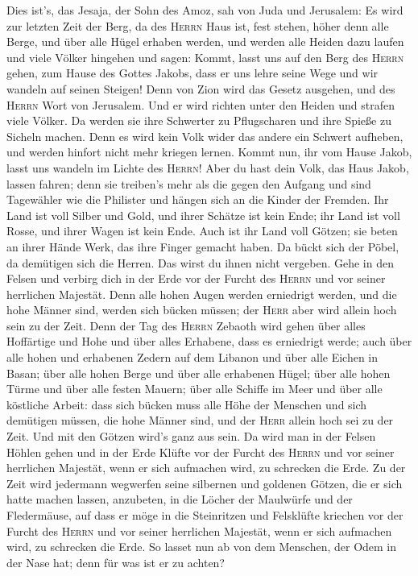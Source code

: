  Dies ist's, das Jesaja, der Sohn des Amoz, sah von Juda
und Jerusalem:  Es wird zur letzten Zeit der Berg, da des
\textsc{Herrn} Haus ist, fest stehen, höher denn alle Berge, und über
alle Hügel erhaben werden, und werden alle Heiden dazu laufen
 und viele Völker hingehen und sagen: Kommt, lasst uns auf
den Berg des \textsc{Herrn} gehen, zum Hause des Gottes Jakobs, dass er
uns lehre seine Wege und wir wandeln auf seinen Steigen! Denn von Zion
wird das Gesetz ausgehen, und des \textsc{Herrn} Wort von Jerusalem.
 Und er wird richten unter den Heiden und strafen viele
Völker. Da werden sie ihre Schwerter zu Pflugscharen und ihre Spieße zu
Sicheln machen. Denn es wird kein Volk wider das andere ein Schwert
aufheben, und werden hinfort nicht mehr kriegen lernen. 
Kommt nun, ihr vom Hause Jakob, lasst uns wandeln im Lichte des
\textsc{Herrn}!  Aber du hast dein Volk, das Haus Jakob,
lassen fahren; denn sie treiben's mehr als die gegen den Aufgang und
sind Tagewähler wie die Philister und hängen sich an die Kinder der
Fremden.  Ihr Land ist voll Silber und Gold, und ihrer
Schätze ist kein Ende; ihr Land ist voll Rosse, und ihrer Wagen ist kein
Ende.  Auch ist ihr Land voll Götzen; sie beten an ihrer
Hände Werk, das ihre Finger gemacht haben.  Da bückt sich
der Pöbel, da demütigen sich die Herren. Das wirst du ihnen nicht
vergeben.  Gehe in den Felsen und verbirg dich in der
Erde vor der Furcht des \textsc{Herrn} und vor seiner herrlichen
Majestät.  Denn alle hohen Augen werden erniedrigt
werden, und die hohe Männer sind, werden sich bücken müssen; der
\textsc{Herr} aber wird allein hoch sein zu der Zeit. 
Denn der Tag des \textsc{Herrn} Zebaoth wird gehen über alles Hoffärtige
und Hohe und über alles Erhabene, dass es erniedrigt werde;
 auch über alle hohen und erhabenen Zedern auf dem
Libanon und über alle Eichen in Basan;  über alle hohen
Berge und über alle erhabenen Hügel;  über alle hohen
Türme und über alle festen Mauern;  über alle Schiffe im
Meer und über alle köstliche Arbeit:  dass sich bücken
muss alle Höhe der Menschen und sich demütigen müssen, die hohe Männer
sind, und der \textsc{Herr} allein hoch sei zu der Zeit. 
Und mit den Götzen wird's ganz aus sein.  Da wird man in
der Felsen Höhlen gehen und in der Erde Klüfte vor der Furcht des
\textsc{Herrn} und vor seiner herrlichen Majestät, wenn er sich
aufmachen wird, zu schrecken die Erde.  Zu der Zeit wird
jedermann wegwerfen seine silbernen und goldenen Götzen, die er sich
hatte machen lassen, anzubeten, in die Löcher der Maulwürfe und der
Fledermäuse,  auf dass er möge in die Steinritzen und
Felsklüfte kriechen vor der Furcht des \textsc{Herrn} und vor seiner
herrlichen Majestät, wenn er sich aufmachen wird, zu schrecken die Erde.
 So lasset nun ab von dem Menschen, der Odem in der Nase
hat; denn für was ist er zu achten?

